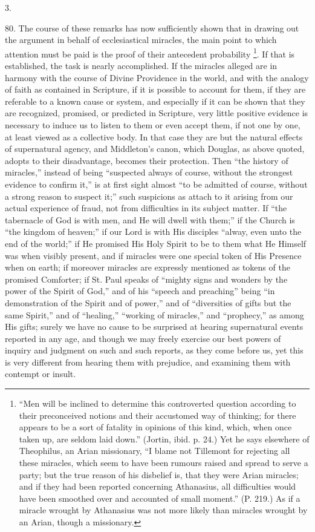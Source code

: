 3.

80.
The course of these remarks has now sufficiently shown that in drawing
out the argument in behalf of ecclesiastical miracles, the main point
to which attention must be paid is the proof of their antecedent
probability \footnote{``Men will be inclined to determine this controverted question
according to their preconceived notions and their accustomed way of
thinking; for there appears to be a sort of fatality in opinions of
this kind, which, when once taken up, are seldom laid down.'' (Jortin,
ibid. p. 24.) Yet he says elsewhere of Theophilus, an Arian
missionary, ``I blame not Tillemont for rejecting all these miracles,
which seem to have been rumours raised and spread to serve a party;
but the true reason of his disbelief is, that they were Arian
miracles; and if they had been reported concerning Athanasius, all
difficulties would have been smoothed over and accounted of small
moment.'' (P. 219.) As if a miracle wrought by Athanasius was not more
likely than miracles wrought by an Arian, though a missionary.}. If that is
established, the task is nearly accomplished. If the miracles alleged
are in harmony with the course of Divine Providence in the world, and
with the analogy of faith as contained in Scripture, if it is possible
to account for them, if they are referable to a known cause or system,
and especially if it can be shown that they are recognized, promised,
or predicted in Scripture, very little positive evidence is necessary
to induce us to listen to them or even accept them, if not one by one,
at least viewed as a collective body. In that case they are but the
natural effects of supernatural agency, and Middleton's canon, which
Douglas, as above quoted, adopts to their disadvantage, becomes
their protection. Then ``the history of miracles,'' instead of being ``suspected
always of course, without the strongest evidence to confirm it,'' is at
first sight almost ``to be admitted of course, without a strong reason
to suspect it;'' such suspicions as attach to it arising from our
actual experience of fraud, not from difficulties in its subject
matter. If ``the tabernacle of God is with men, and He will dwell with
them;'' if the Church is ``the kingdom of heaven;'' if our Lord is with
His disciples ``alway, even unto the end of the world;'' if He promised
His Holy Spirit to be to them what He Himself was when visibly
present, and if miracles were one special token of His Presence when
on earth; if moreover miracles are expressly mentioned as tokens of
the promised Comforter; if St. Paul speaks of ``mighty signs and
wonders by the power of the Spirit of God,'' and of his ``speech and
preaching'' being ``in demonstration of the Spirit and of power,'' and of
``diversities of gifts but the same Spirit,'' and of ``healing,'' ``working
of miracles,'' and ``prophecy,'' as among His gifts; surely we have no
cause to be surprised at hearing supernatural events reported in any
age, and though we may freely exercise our best powers of inquiry and
judgment on such and such reports, as they come before us, yet this is
very different from hearing them with prejudice, and examining them
with contempt or insult.

